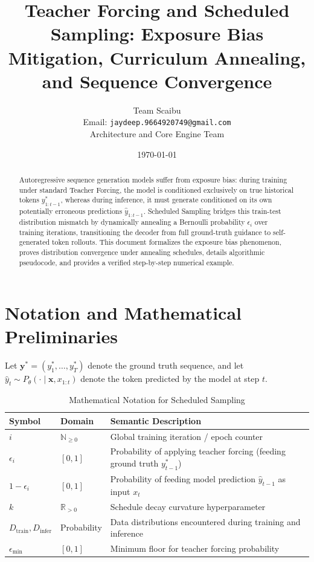 \documentclass[11pt,a4paper]{article}
\title{Teacher Forcing and Scheduled Sampling: Exposure Bias Mitigation, Curriculum Annealing, and Sequence Convergence}
\author{Team Scaibu \\ \small Email: \texttt{jaydeep.9664920749@gmail.com} \\ \small Architecture and Core Engine Team}
\date{\today}
\theoremstyle{definition}
\begin{document}
\maketitle

\begin{abstract}
Autoregressive sequence generation models suffer from exposure bias: during training under standard Teacher Forcing, the model is conditioned exclusively on true historical tokens $y_{1:t-1}^*$, whereas during inference, it must generate conditioned on its own potentially erroneous predictions $\hat{y}_{1:t-1}$. Scheduled Sampling bridges this train-test distribution mismatch by dynamically annealing a Bernoulli probability $\epsilon_i$ over training iterations, transitioning the decoder from full ground-truth guidance to self-generated token rollouts. This document formalizes the exposure bias phenomenon, proves distribution convergence under annealing schedules, details algorithmic pseudocode, and provides a verified step-by-step numerical example.
\end{abstract}

\section{Notation and Mathematical Preliminaries}

Let $\mathbf{y}^* = (y_1^*, \dots, y_T^*)$ denote the ground truth sequence, and let $\hat{y}_t \sim P_\theta(\cdot \mid \mathbf{x}, x_{1:t})$ denote the token predicted by the model at step $t$.

\begin{table}[h]
\centering
\caption{Mathematical Notation for Scheduled Sampling}
\begin{tabular}{lll}
\toprule
\textbf{Symbol} & \textbf{Domain} & \textbf{Semantic Description} \\
\midrule
$i$ & $\mathbb{N}_{\ge 0}$ & Global training iteration / epoch counter \\
$\epsilon_i$ & $[0, 1]$ & Probability of applying teacher forcing (feeding ground truth $y_{t-1}^*$) \\
$1 - \epsilon_i$ & $[0, 1]$ & Probability of feeding model prediction $\hat{y}_{t-1}$ as input $x_t$ \\
$k$ & $\mathbb{R}_{> 0}$ & Schedule decay curvature hyperparameter \\
$D_{\text{train}}, D_{\text{infer}}$ & Probability & Data distributions encountered during training and inference \\
$\epsilon_{\min}$ & $[0, 1]$ & Minimum floor for teacher forcing probability \\
\bottomrule
\end{tabular}
\end{table}
\end{document}
